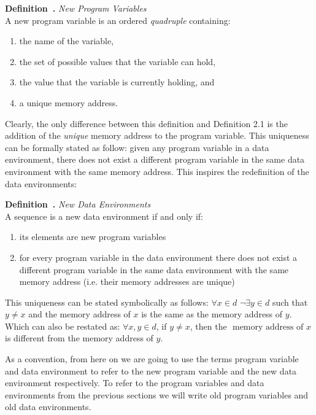 \documentclass[11pt]{article}
\newcounter{definition}
\newenvironment{definition}[1][]{\stepcounter{definition}\par\medskip\noindent
\textbf{Definition~\thesection.\thedefinition #1} \rmfamily}{}
\begin{document}
\begin{definition} \emph{New Program Variables} \\
A new program variable is an ordered \emph{quadruple} containing:
\begin{enumerate}[noitemsep]
\item the name of the variable,
\item the set of possible values that the variable can hold,
\item the value that the variable is currently holding, and
\item a unique memory address.
\end{enumerate}
\end{definition}


Clearly, the only difference between this definition and Definition 2.1 is the addition of the \emph{unique} memory address to the program variable. This uniqueness can be formally stated as follow: given any program variable in a data environment, there does not exist a different program variable in the same data environment with the same memory address. This inspires the redefinition of the data environments:

\begin{definition} \emph{New Data Environments} \\
 A sequence is a new data environment if and only if:
 \begin{enumerate}[noitemsep]
  \item its elements are new program variables
  \item for every program variable in the data environment there does not exist a different program variable in the same data environment with the same memory address (i.e. their memory addresses are unique)
 \end{enumerate}
\end{definition}

This uniqueness can be stated symbolically as follows: $\forall x \in d$ $\neg \exists y \in d$ such that $y\neq x$ and the memory address of $x$ is the same as the memory address of $y$. Which can also be restated as: $\forall x,y \in d$, if $y \neq x$, then the $\text{ memory address of }x$ is different from the memory address of $y$.

As a convention, from here on we are going to use the terms program variable and data environment to refer to the new program variable and the new data environment respectively. To refer to the program variables and data environments from the previous sections we will write old program variables and old data environments.
\end{document}
